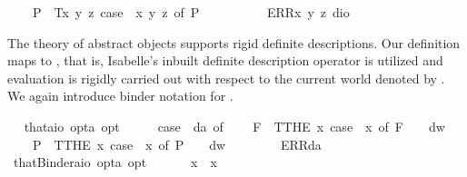 \begin{isabellebody}
\ \ \ \ P{\isacharparenleft}{\isacharunderscore}{\isacharparenright}\ {\isasymRightarrow}\ T{\isacharparenleft}{\isasymlambda}x\ y\ z{\isachardot}\ case\ {\isacharparenleft}{\isasymPhi}\ x\ y\ z{\isacharparenright}\ of\ P{\isacharparenleft}{\isasymphi}{\isacharparenright}\ {\isasymRightarrow}\ {\isasymphi}{\isacharparenright}\ {\isacharbar}\ \isanewline
\ \ \ \ {\isacharunderscore}\ {\isasymRightarrow}\ ERR{\isacharparenleft}{\isasymlambda}x\ y\ z{\isachardot}\ dio{\isacharparenright}{\isachardoublequoteclose}%
\begin{isamarkuptext}%
The theory of abstract objects supports rigid definite descriptions. Our definition maps
   to , that is, Isabelle's inbuilt definite description operator 
  is utilized and evaluation is rigidly carried out with respect to the current world denoted by .
  We again introduce binder notation for \isa{\isactrlbold {\isasymiota}}.%
\end{isamarkuptext}\isamarkuptrue%
\ \isamarkupfalse%
\ that{\isacharcolon}{\isacharcolon}{\isachardoublequoteopen}{\isacharparenleft}{\isacharprime}a{\isasymRightarrow}io\ opt{\isacharparenright}{\isasymRightarrow}{\isacharprime}a\ opt{\isachardoublequoteclose}\ {\isacharparenleft}{\isachardoublequoteopen}\isactrlbold {\isasymiota}{\isachardoublequoteclose}{\isacharparenright}\ \ \ {\isachardoublequoteopen}\isactrlbold {\isasymiota}{\isasymPhi}\ {\isasymequiv}\ case\ {\isacharparenleft}{\isasymPhi}\ da{\isacharparenright}\ of\isanewline
\ \ \ \ F{\isacharparenleft}{\isacharunderscore}{\isacharparenright}\ {\isasymRightarrow}\ T{\isacharparenleft}THE\ x{\isachardot}\ case\ {\isacharparenleft}{\isasymPhi}\ x{\isacharparenright}\ of\ F\ {\isasympsi}\ {\isasymRightarrow}\ {\isasympsi}\ dw{\isacharparenright}\ {\isacharbar}\ \isanewline
\ \ \ \ P{\isacharparenleft}{\isacharunderscore}{\isacharparenright}\ {\isasymRightarrow}\ T{\isacharparenleft}THE\ x{\isachardot}\ case\ {\isacharparenleft}{\isasymPhi}\ x{\isacharparenright}\ of\ P\ {\isasympsi}\ {\isasymRightarrow}\ {\isasympsi}\ dw{\isacharparenright}\ {\isacharbar}\ \isanewline
\ \ \ \ {\isacharunderscore}\ {\isasymRightarrow}\ ERR{\isacharparenleft}da{\isacharparenright}{\isachardoublequoteclose}\isanewline
\ \isamarkupfalse%
\ thatBinder{\isacharcolon}{\isacharcolon}{\isachardoublequoteopen}{\isacharparenleft}{\isacharprime}a{\isasymRightarrow}io\ opt{\isacharparenright}{\isasymRightarrow}{\isacharprime}a\ opt{\isachardoublequoteclose}\ {\isacharparenleft}\ {\isachardoublequoteopen}\isactrlbold {\isasymiota}{\isachardoublequoteclose}\ {\isacharbrackleft}{}{\isacharbrackright}\ {}{\isacharparenright}\ \ \ {\isachardoublequoteopen}\isactrlbold {\isasymiota}x{\isachardot}\ {\isasymphi}\ x\ {\isasymequiv}\ \isactrlbold {\isasymiota}\ {\isasymphi}{\isachardoublequoteclose}%

\end{isabellebody}
